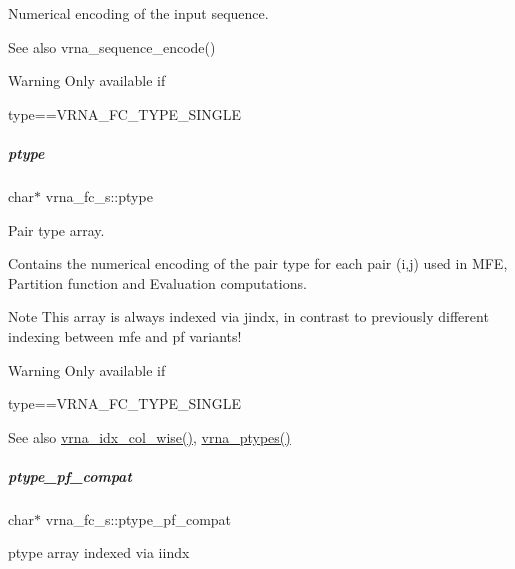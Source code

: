 Numerical encoding of the input sequence. 

\begin{DoxySeeAlso}{See also}
vrna\+\_\+sequence\+\_\+encode() 
\end{DoxySeeAlso}
\begin{DoxyWarning}{Warning}
Only available if\begin{DoxyVerb}type==VRNA_FC_TYPE_SINGLE \end{DoxyVerb}
 
\end{DoxyWarning}
\mbox{\label{group__fold__compound_a3fbea559f1d1976b2d67c215cdeee0b2}} 
\subparagraph{\texorpdfstring{ptype}{ptype}}
{\footnotesize\ttfamily char$\ast$ vrna\+\_\+fc\+\_\+s\+::ptype}



Pair type array. 

Contains the numerical encoding of the pair type for each pair (i,j) used in M\+FE, Partition function and Evaluation computations. \begin{DoxyNote}{Note}
This array is always indexed via jindx, in contrast to previously different indexing between mfe and pf variants! 
\end{DoxyNote}
\begin{DoxyWarning}{Warning}
Only available if\begin{DoxyVerb}type==VRNA_FC_TYPE_SINGLE \end{DoxyVerb}
 
\end{DoxyWarning}
\begin{DoxySeeAlso}{See also}
\mbox{\hyperlink{group__utils_ga89ebc69c52fa0c78c9e1974b0017746b}{vrna\+\_\+idx\+\_\+col\+\_\+wise()}}, \mbox{\hyperlink{group__alphabet__utils_ga51a9e86a5f731f5f2f5584ee67cee4a8}{vrna\+\_\+ptypes()}} 
\end{DoxySeeAlso}
\mbox{\label{group__fold__compound_a7fe1235ce3d41287695f1ae1e283e8fc}} 
\subparagraph{\texorpdfstring{ptype\_pf\_compat}{ptype\_pf\_compat}}
{\footnotesize\ttfamily char$\ast$ vrna\+\_\+fc\+\_\+s\+::ptype\+\_\+pf\+\_\+compat}



ptype array indexed via iindx 

